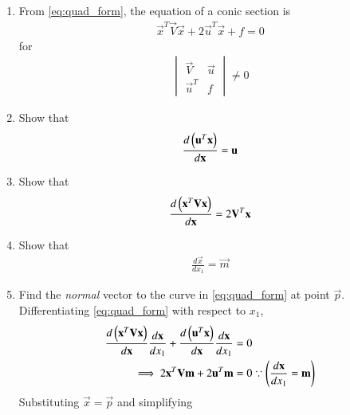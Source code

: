 \renewcommand{\theequation}{\theenumi}
\begin{enumerate}[label=\arabic*.,ref=\thesubsection.\theenumi]
\item From \eqref{eq:quad_form}, the equation of a conic section is 
\begin{align}
\vec{x}^T\vec{V}\vec{x}+2\vec{u}^T\vec{x}+f=0
\end{align}
%
for
%
\begin{align}
\begin{vmatrix}
\vec{V}&\vec{u}
\\
\vec{u}^T&f
\end{vmatrix}
\ne 0
\end{align}
%
\item Show that 
\begin{align}
\frac{d\left(\mathbf{u}^T\mathbf{x}\right)}{d\mathbf{x}} = \mathbf{u}
\end{align}
\item Show that 
\begin{align}
\frac{d\left(\mathbf{x}^T\mathbf{V}\mathbf{x}\right)}{d\mathbf{x}} = 2\mathbf{V}^T\mathbf{x}
\end{align}
\item Show that 
\begin{align}
\frac{d\vec{x}}{dx_1} = \vec{m}
\end{align}
%
\item Find the {\em normal} vector to the curve in \eqref{eq:quad_form} at 
point $\vec{p}$.
\\
\solution Differentiating \eqref{eq:quad_form} with respect to 
$x_1$,
\begin{align}
\frac{d\left(\mathbf{x}^T\mathbf{V}\mathbf{x}\right)}{d\mathbf{x}}\frac{d\mathbf{x}}{dx_1}+\frac{d\left(\mathbf{u}^T\mathbf{x}\right)}{d\mathbf{x}}\frac{d\mathbf{x}}{dx_1}
&= 0
\\
\implies 2\mathbf{x}^T\mathbf{V}\mathbf{m}+2\mathbf{u}^T\mathbf{m}
& = 0  \because \left(\frac{d\mathbf{x}}{dx_1} = \mathbf{m}\right)
\end{align}
Substituting  $\vec{x} = \vec{p}$ and simplifying

\end{enumerate}
